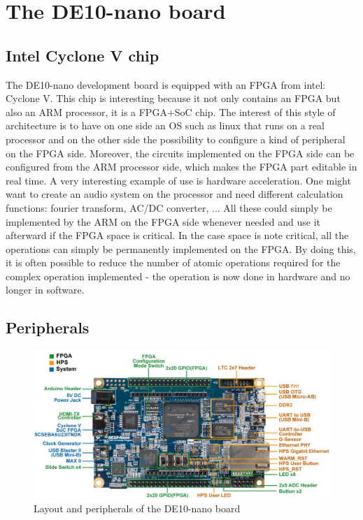 \documentclass[12pt]{article}
\begin{document}
\section{The DE10-nano board}

\subsection{Intel Cyclone V chip}
The DE10-nano development board is equipped with an FPGA from intel: Cyclone V. This chip is interesting because it not only contains an FPGA but also an ARM processor, it is a FPGA+SoC chip. The interest of this style of architecture is to have on one side an OS such as linux that runs on a real processor and on the other side the possibility to configure a kind of peripheral on the FPGA side. Moreover, the circuits implemented on the FPGA side can be configured from the ARM processor side, which makes the FPGA part editable in real time. A very interesting example of use is hardware acceleration. One might want to create an audio system on the processor and need different calculation functions: fourier transform, AC/DC converter, ... All these could simply be implemented by the ARM on the FPGA side whenever needed and use it afterward if the FPGA space is critical. In the case space is note critical, all the operations can simply be permanently implemented on the FPGA. By doing this, it is often possible to reduce the number of atomic operations required for the complex operation implemented - the operation is now done in hardware and no longer in software.

\subsection{Peripherals}

\begin{figure}
  \center
  \includegraphics[width=15cm]{"res/chapter1/layout_components.png"}
  \caption{Layout and peripherals of the DE10-nano board}
  \label{fig:de10nano_peripherals}
\end{figure}
\end{document}
